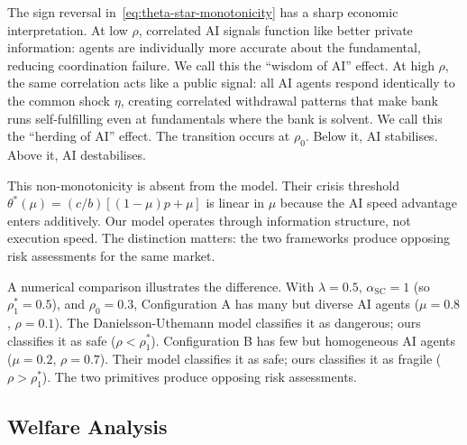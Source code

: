 The sign reversal in~\eqref{eq:theta-star-monotonicity} has a sharp economic interpretation. At low $\rho$, correlated AI signals function like better private information: agents are individually more accurate about the fundamental, reducing coordination failure. We call this the ``wisdom of AI'' effect. At high $\rho$, the same correlation acts like a public signal: all AI agents respond identically to the common shock $\eta$, creating correlated withdrawal patterns that make bank runs self-fulfilling even at fundamentals where the bank is solvent. We call this the ``herding of AI'' effect. The transition occurs at $\rho_0$. Below it, AI stabilises. Above it, AI destabilises.

This non-monotonicity is absent from the \citet{danielsson2025} model. Their crisis threshold $\theta^*(\mu) = (c/b)[(1-\mu)p + \mu]$ is linear in $\mu$ because the AI speed advantage enters additively. Our model operates through information structure, not execution speed. The distinction matters: the two frameworks produce opposing risk assessments for the same market.

A numerical comparison illustrates the difference. With $\lambda = 0.5$, $\alpha_{\text{SC}} = 1$ (so $\rho_1^* = 0.5$), and $\rho_0 = 0.3$, Configuration A has many but diverse AI agents ($\mu = 0.8$, $\rho = 0.1$). The Danielsson-Uthemann model classifies it as dangerous; ours classifies it as safe ($\rho < \rho_1^*$). Configuration B has few but homogeneous AI agents ($\mu = 0.2$, $\rho = 0.7$). Their model classifies it as safe; ours classifies it as fragile ($\rho > \rho_1^*$). The two primitives produce opposing risk assessments.

\subsection{Welfare Analysis}

